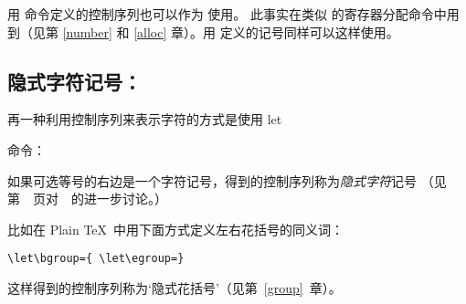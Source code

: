 \documentclass{book}
\begin{document}

用  命令定义的控制序列也可以作为  使用。
此事实在类似  的寄存器分配命令中用到（见第 \ref{number} 和
\ref{alloc} 章）。用  定义的记号同样可以这样使用。

\subsection{隐式字符记号：\protect{}}

再一种利用控制序列来表示字符的方式是使用 \cstoidx let\par{} 命令：
\begin{disp}\end{disp}
如果可选等号的右边是一个字符记号，得到的控制序列称为\emph{隐式字符}记号%
（见第~\pageref{let}~页对~~的进一步讨论。）

比如在 Plain \TeX\ 中用下面方式定义左右花括号的同义词：
\begin{verbatim}
\let\bgroup={ \let\egroup=}
\end{verbatim}
这样得到的控制序列称为`隐式花括号'（见第~\ref{group}~章）。
\end{document}
